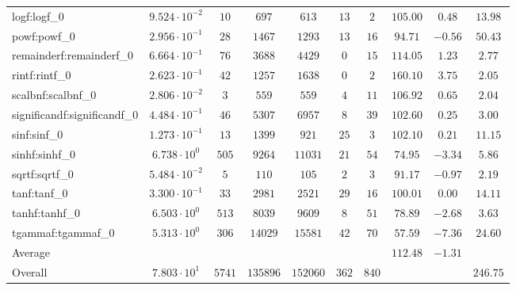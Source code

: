 \begin{tabular}{|l|c|c|c|c|c|c|c|c|c|}
logf:logf\_0                 & $ 9.524 \cdot 10^{-2} $ & $ 10     $ & $ 697    $ & $ 613    $ & $ 13  $ & $ 2   $ & $ 105.00      $ & $ 0.48    $ & $ 13.98   $ \\
powf:powf\_0                 & $ 2.956 \cdot 10^{-1} $ & $ 28     $ & $ 1467   $ & $ 1293   $ & $ 13  $ & $ 16  $ & $ 94.71       $ & $ -0.56   $ & $ 50.43   $ \\
remainderf:remainderf\_0     & $ 6.664 \cdot 10^{-1} $ & $ 76     $ & $ 3688   $ & $ 4429   $ & $ 0   $ & $ 15  $ & $ 114.05      $ & $ 1.23    $ & $ 2.77    $ \\
rintf:rintf\_0               & $ 2.623 \cdot 10^{-1} $ & $ 42     $ & $ 1257   $ & $ 1638   $ & $ 0   $ & $ 2   $ & $ 160.10      $ & $ 3.75    $ & $ 2.05    $ \\
scalbnf:scalbnf\_0           & $ 2.806 \cdot 10^{-2} $ & $ 3      $ & $ 559    $ & $ 559    $ & $ 4   $ & $ 11  $ & $ 106.92      $ & $ 0.65    $ & $ 2.04    $ \\
significandf:significandf\_0 & $ 4.484 \cdot 10^{-1} $ & $ 46     $ & $ 5307   $ & $ 6957   $ & $ 8   $ & $ 39  $ & $ 102.60      $ & $ 0.25    $ & $ 3.00    $ \\
sinf:sinf\_0                 & $ 1.273 \cdot 10^{-1} $ & $ 13     $ & $ 1399   $ & $ 921    $ & $ 25  $ & $ 3   $ & $ 102.10      $ & $ 0.21    $ & $ 11.15   $ \\
sinhf:sinhf\_0               & $ 6.738 \cdot 10^{0}  $ & $ 505    $ & $ 9264   $ & $ 11031  $ & $ 21  $ & $ 54  $ & $ 74.95       $ & $ -3.34   $ & $ 5.86    $ \\
sqrtf:sqrtf\_0               & $ 5.484 \cdot 10^{-2} $ & $ 5      $ & $ 110    $ & $ 105    $ & $ 2   $ & $ 3   $ & $ 91.17       $ & $ -0.97   $ & $ 2.19    $ \\
tanf:tanf\_0                 & $ 3.300 \cdot 10^{-1} $ & $ 33     $ & $ 2981   $ & $ 2521   $ & $ 29  $ & $ 16  $ & $ 100.01      $ & $ 0.00    $ & $ 14.11   $ \\
tanhf:tanhf\_0               & $ 6.503 \cdot 10^{0}  $ & $ 513    $ & $ 8039   $ & $ 9609   $ & $ 8   $ & $ 51  $ & $ 78.89       $ & $ -2.68   $ & $ 3.63    $ \\
tgammaf:tgammaf\_0           & $ 5.313 \cdot 10^{0}  $ & $ 306    $ & $ 14029  $ & $ 15581  $ & $ 42  $ & $ 70  $ & $ 57.59       $ & $ -7.36   $ & $ 24.60   $ \\
\hline
Average                      & $                     $ & $        $ & $        $ & $        $ & $     $ & $     $ & $ 112.48      $ & $ -1.31   $ & $         $ \\
\hline
Overall                      & $ 7.803 \cdot 10^{1}  $ & $ 5741   $ & $ 135896 $ & $ 152060 $ & $ 362 $ & $ 840 $ & $             $ & $         $ & $ 246.75  $ \\
\hline
\end{tabular}
